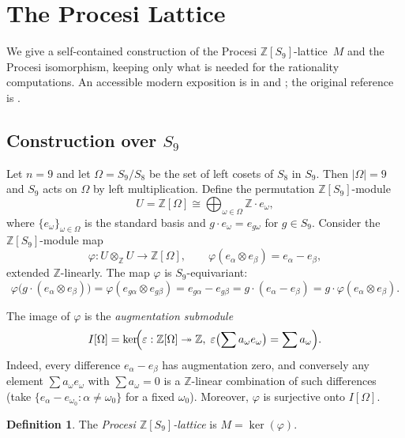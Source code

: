 \documentclass[12pt,a4paper]{article}
\theoremstyle{definition}
\newtheorem{definition}[theorem]{Definition}
\begin{document}
\section{The Procesi Lattice}
\label{sec:procesi}

We give a self-contained construction of the Procesi
\(\mathbb{Z}[S_9]\)-lattice~\(M\) and the Procesi isomorphism, keeping only what
is needed for the rationality computations. An accessible modern exposition is
in \cite[\S5]{ABGV2011} and
\cite{Formanek2002}; the original reference is \cite{Procesi1967}.

\subsection{Construction over \(S_9\)}

Let \(n = 9\) and let \(\Omega = S_9/S_8\) be the set of left cosets of \(S_8\)
in \(S_9\). Then \(|\Omega| = 9\) and \(S_9\) acts on \(\Omega\) by left
multiplication. Define the permutation \(\mathbb{Z}[S_9]\)-module
\[
U = \mathbb{Z}[\Omega] \cong \bigoplus_{\omega \in \Omega} \mathbb{Z}\cdot
e_\omega ,
\]
where \(\{e_\omega\}_{\omega \in \Omega}\) is the standard basis and
\(g \cdot e_\omega = e_{g\omega}\) for \(g \in S_9\).  Consider the
\(\mathbb{Z}[S_9]\)-module map
\[
\varphi : U \otimes_{\mathbb{Z}} U \longrightarrow \mathbb{Z}[\Omega], \qquad
\varphi(e_\alpha \otimes e_\beta) = e_\alpha - e_\beta ,
\]
extended \(\mathbb{Z}\)-linearly.  The map \(\varphi\) is \(S_9\)-equivariant:
\[
\varphi\bigl(g \cdot (e_\alpha \otimes e_\beta)\bigr)
= \varphi(e_{g\alpha} \otimes e_{g\beta})
= e_{g\alpha} - e_{g\beta}
= g \cdot (e_\alpha - e_\beta)
= g \cdot \varphi(e_\alpha \otimes e_\beta).
\]

The image of \(\varphi\) is the \emph{augmentation submodule}
\[
I[\Omega] = \ker\!\Bigl( \varepsilon : \mathbb{Z}[\Omega] \twoheadrightarrow
\mathbb{Z},\;
\varepsilon\bigl(\sum a_\omega e_\omega\bigr) = \sum a_\omega \Bigr).
\]
Indeed, every difference \(e_\alpha - e_\beta\) has augmentation zero, and
conversely any element \(\sum a_\omega e_\omega\) with \(\sum a_\omega = 0\) is
a \(\mathbb{Z}\)-linear combination of such differences (take \(\{e_\alpha -
e_{\omega_0} : \alpha \neq \omega_0\}\) for a fixed \(\omega_0\)). Moreover,
\(\varphi\) is surjective onto \(I[\Omega]\).

\begin{definition}
The \emph{Procesi \(\mathbb{Z}[S_9]\)-lattice} is \(M = \ker(\varphi)\).
\end{definition}
\end{document}
